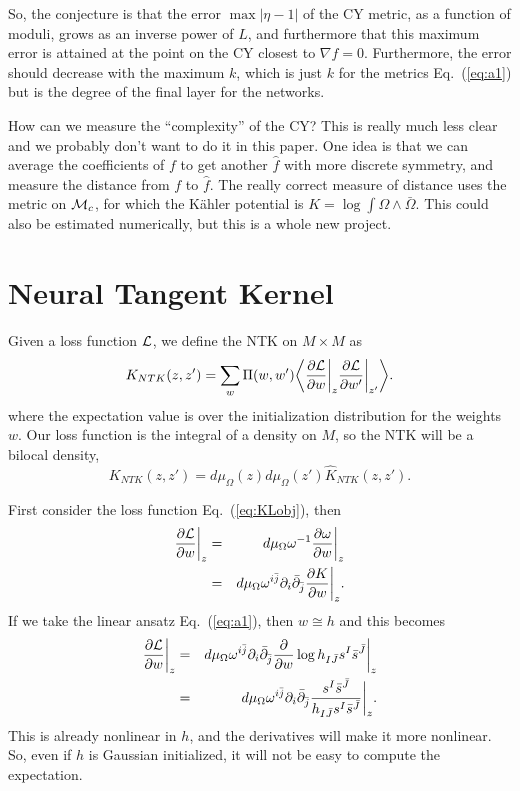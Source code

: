 \documentclass[12pt]{article}
\def\CM {{\cal M}}
\def\CL {{\cal L}}
\def\vev#1{\bigg\langle #1 \bigg\rangle}
\newcommand{\eq}[1]{Eq.~(\ref{eq:#1})}
\newcommand{\be}{\begin{equation}}
\newcommand{\ee}{\end{equation}}
\newcommand{\bea}{\begin{eqnarray}}
\newcommand{\eea}{\end{eqnarray}}
\def\bj{{\bar{j}}}
\def\bs{{\bar{s}}}
\def\bJ{{\bar{J}}}
\def\hK{{\hat K}}
\begin{document}
So, the conjecture is that the error $\max |\eta-1|$ of the CY metric, as a function of moduli, grows as an
inverse power of $L$, and furthermore that this maximum error is attained at the point on the CY closest to
$\nabla f=0$.  Furthermore, the error should decrease with the maximum $k$, which is just $k$ for the 
metrics \eq{a1} but is the degree of the final layer for the networks.

How can we measure the ``complexity'' of the CY?  This is really much less clear and we probably don't want
to do it in this paper.  One idea is that we can average the coefficients of $f$ to get another $\hat f$ with more
discrete symmetry, and measure the distance from $f$ to $\hat f$.  The really correct measure of distance uses
the metric on $\CM_c$, for which the K\"ahler potential is $K = \log\int \Omega\wedge\bar\Omega$.
This could also be estimated numerically, but this is a whole new project.


\iffalse
\section{ Neural Tangent Kernel }

Given a loss function $\CL$, we define the NTK on $M\times M$ as
\be
K_{NTK}(z,z') = \sum_w \Pi(w,w') \vev{ \frac{\partial\CL}{\partial w}\bigg|_z \frac{\partial\CL}{\partial w'}\bigg|_{z'} }.
\ee
where the expectation value is over the initialization distribution for the weights $w$.
Our loss function is the integral of a density on $M$, so the NTK will be a bilocal density,
\be
K_{NTK}(z,z') = d\mu_\Omega(z) d\mu_\Omega(z') \hK_{NTK}(z,z') .
\ee


First consider the loss function \eq{KLobj}, then
\bea
\frac{\partial\CL}{\partial w}\bigg|_z &=& d\mu_\Omega \omega^{-1} \frac{\partial\omega}{\partial w}\bigg|_z \\
&=& d\mu_\Omega \omega^{i\bj} \partial_i \bar\partial_\bj \frac{\partial K}{\partial w}\bigg|_z .
\eea
If we take the linear ansatz \eq{a1}, then $w\cong h$ and this becomes
\bea \label{eq:Lgrad}
\frac{\partial\CL}{\partial w}\bigg|_z &=& d\mu_\Omega \omega^{i\bj} \partial_i \bar\partial_\bj 
\frac{\partial }{\partial w} \log h_{I\bJ} s^I \bs^\bJ  \bigg|_z \\
&=& d\mu_\Omega \omega^{i\bj} \partial_i \bar\partial_\bj 
\frac{s^I \bs^\bJ }{ h_{I\bJ} s^I \bs^\bJ }  \bigg|_z .
\eea
This is already nonlinear in $h$, and the derivatives will make it more nonlinear.
So, even if $h$ is Gaussian initialized, it will not be easy to compute the expectation.
\end{document}
